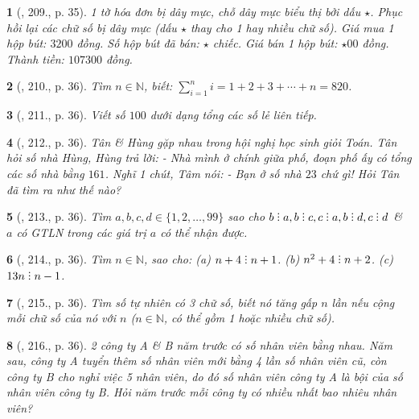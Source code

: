 \documentclass{article}
\newtheorem{baitoan}{}
\DeclareRobustCommand{\divby}{%
	\mathrel{\vbox{\baselineskip.65ex\lineskiplimit0pt\hbox{.}\hbox{.}\hbox{.}}}%
}
\begin{document}
\begin{baitoan}[\cite{Binh_Toan_6_tap_1}, 209., p. 35]
	1 tờ hóa đơn bị dây mực, chỗ dây mực biểu thị bởi dấu $\star$. Phục hồi lại các chữ số bị dây mực (dấu $\star$ thay cho 1 hay nhiều chữ số). Giá mua 1 hộp bút: $3200$ đồng. Số hộp bút đã bán: $\star$ chiếc. Giá bán 1 hộp bút: $\star00$ đồng. Thành tiền: $107300$ đồng.
\end{baitoan}

\begin{baitoan}[\cite{Binh_Toan_6_tap_1}, 210., p. 36]
	Tìm $n\in\mathbb{N}$, biết: $\sum_{i=1}^n i = 1 + 2 + 3 + \cdots + n = 820$.
\end{baitoan}

\begin{baitoan}[\cite{Binh_Toan_6_tap_1}, 211., p. 36]
	Viết số $100$ dưới dạng tổng các số lẻ liên tiếp.
\end{baitoan}

\begin{baitoan}[\cite{Binh_Toan_6_tap_1}, 212., p. 36]
	Tân \& Hùng gặp nhau trong hội nghị học sinh giỏi Toán. Tân hỏi số nhà Hùng, Hùng trả lời: - Nhà mình ở chính giữa phố, đoạn phố ấy có tổng các số nhà bằng $161$. Nghĩ 1 chút, Tâm nói: - Bạn ở số nhà $23$ chứ gì! Hỏi Tân đã tìm ra như thế nào?
\end{baitoan}

\begin{baitoan}[\cite{Binh_Toan_6_tap_1}, 213., p. 36]
	Tìm $a,b,c,d\in\{1,2,\ldots,99\}$ sao cho $b\divby a,b\divby c,c\divby a,b\divby d,c\divby d$ \& $a$ có {\rm GTLN} trong các giá trị $a$ có thể nhận được.
\end{baitoan}

\begin{baitoan}[\cite{Binh_Toan_6_tap_1}, 214., p. 36]
	Tìm $n\in\mathbb{N}$, sao cho: (a) $n + 4\divby n + 1$. (b) $n^2 + 4\divby n + 2$. (c) $13n\divby n - 1$.
\end{baitoan}

\begin{baitoan}[\cite{Binh_Toan_6_tap_1}, 215., p. 36]
	Tìm số tự nhiên có 3 chữ số, biết nó tăng gấp $n$ lần nếu cộng mỗi chữ số của nó với $n$ ($n\in\mathbb{N}$, có thể gồm 1 hoặc nhiều chữ số).
\end{baitoan}

\begin{baitoan}[\cite{Binh_Toan_6_tap_1}, 216., p. 36]
	2 công ty A \& B năm trước có số nhân viên bằng nhau. Năm sau, công ty A tuyển thêm số nhân viên mới bằng 4 lần số nhân viên cũ, còn công ty B cho nghỉ việc 5 nhân viên, do đó số nhân viên công ty A là bội của số nhân viên công ty B. Hỏi năm trước mỗi công ty có nhiều nhất bao nhiêu nhân viên?
\end{baitoan}
\end{document}
